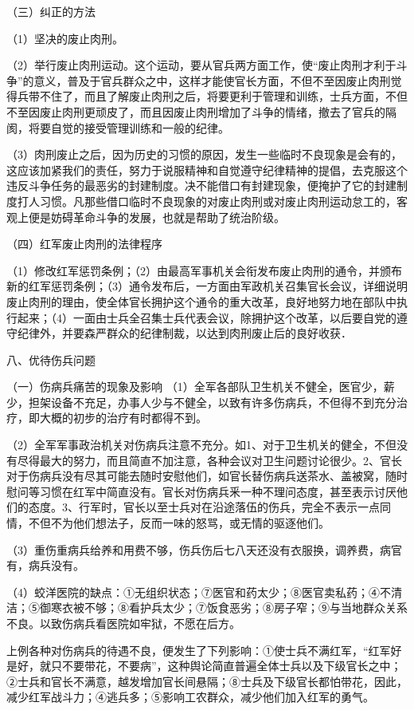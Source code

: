 （三）纠正的方法

（1）坚决的废止肉刑。

（2）举行废止肉刑运动。这个运动，要从官兵两方面工作，使“废止肉刑才利于斗争”的意义，普及于官兵群众之中，这样才能使官长方面，不但不至因废止肉刑觉得兵带不住了，而且了解废止肉刑之后，将要更利于管理和训练，士兵方面，不但不至因废止肉刑更顽皮了，而且因废止肉刑增加了斗争的情绪，撤去了官兵的隔阂，将要自觉的接受管理训练和一般的纪律。

（3）肉刑废止之后，因为历史的习惯的原因，发生一些临时不良现象是会有的，这应该加紧我们的责任，努力于说服精神和自觉遵守纪律精神的提倡，去克服这个违反斗争任务的最恶劣的封建制度。决不能借口有封建现象，便掩护了它的封建制度打人习惯。凡那些借口临时不良现象的对废止肉刑或对废止肉刑运动怠工的，客观上便是妨碍革命斗争的发展，也就是帮助了统治阶级。

（四）红军废止肉刑的法律程序


（1）修改红军惩罚条例；（2）由最高军事机关会衔发布废止肉刑的通令，并颁布新的红军惩罚条例；（3）通令发布后，一方面由军政机关召集官长会议，详细说明废止肉刑的理由，使全体官长拥护这个通令的重大改革，良好地努力地在部队中执行起来；（4）一面由士兵全召集士兵代表会议，除拥护这个改革，以后要自党的遵守纪律外，并要森严群众的纪律制裁，以达到肉刑废止后的良好收获．

八、优待伤兵问题

（一）伤病兵痛苦的现象及影响 
（1）全军各部队卫生机关不健全，医官少，薪少，担架设备不充足，办事人少与不健全，以致有许多伤病兵，不但得不到充分治疗，即大概的初步的治疗有时都得不到。

（2）全军军事政治机关对伤病兵注意不充分。如1、对于卫生机关的健全，不但没有尽得最大的努力，而且简直不加注意，各种会议对卫生问题讨论很少。2、官长对于伤病兵没有尽其可能去随时安慰他们，如官长替伤病兵送茶水、盖被窝，随时慰问等习惯在红军中简直没有。官长对伤病兵釆一种不理问态度，甚至表示讨厌他们的态度。3、行军时，官长以至士兵对在沿途落伍的伤兵，完全不表示一点同情，不但不为他们想法子，反而一味的怒骂，或无情的驱逐他们。

（3）重伤重病兵给养和用费不够，伤兵伤后七八天还没有衣服换，调养费，病官有，病兵没有。

（4）蛟洋医院的缺点：①无组织状态；⑦医官和药太少；⑧医官卖私药；④不清洁；⑤御寒衣被不够；⑧看护兵太少；⑦饭食恶劣；⑧房子窄；⑨与当地群众关系不良。以致伤病兵看医院如牢狱，不愿在后方。

上例各种对伤病兵的待遇不良，便发生了下列影响：①使士兵不满红军，“红军好是好，就只不要带花，不要病”，这种舆论简直普遍全体士兵以及下级官长之中；②士兵和官长不满意，越发增加官长间悬隔；⑧士兵及下级官长都怕带花，因此，减少红军战斗力；④逃兵多；⑤影响工农群众，减少他们加入红军的勇气。

